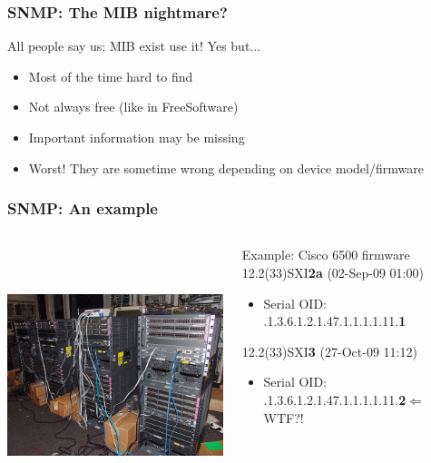 \documentclass{beamer}
\begin{document}
\begin{frame}
    \frametitle{SNMP: The MIB nightmare?}

    \begin{block}{All people say us: MIB exist use it!}
    Yes but...
    \pause
    \begin{itemize}
    \item Most of the time hard to find
    \pause
    \item Not always free (like in FreeSoftware)
    \pause
    \item Important information may be missing
    \pause
    \item Worst! They are sometime wrong depending on device model/firmware
    \end{itemize}
    \end{block}

\end{frame}
\begin{frame}
    \frametitle{SNMP: An example}

 \begin{columns}
 \begin{column}{0.35\textwidth}
         \includegraphics[height=7.5cm]{./pics/cisco.jpg}
 \end{column}
 \begin{column}{0.65\textwidth}
    \begin{block}{Example: Cisco 6500 firmware}
    12.2(33)SXI\textbf{2a} (02-Sep-09 01:00)
    \begin{itemize}
    \item Serial OID: .1.3.6.1.2.1.47.1.1.1.1.11.\textbf{1}
    \end{itemize}
    12.2(33)SXI\textbf{3} (27-Oct-09 11:12)
    \begin{itemize}
    \item Serial OID: .1.3.6.1.2.1.47.1.1.1.1.11.\textbf{2}$\Longleftarrow$ WTF?!
    \end{itemize}
    \end{block}

 \end{column}
\end{columns}


    
\end{frame}
\end{document}
